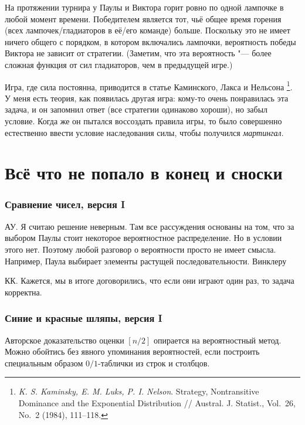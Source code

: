\documentclass[twoside]{book}
\begin{document}
На протяжении турнира у Паулы и Виктора горит ровно по одной лампочке в любой момент времени.
Победителем является тот, чьё общее время горения (всех лампочек/гладиаторов в её/его команде) больше.
Поскольку это не имеет ничего общего с порядком, в котором включались лампочки, вероятность победы Виктора не зависит от стратегии.
(Заметим, что эта вероятность "--- более сложная функция от сил гладиаторов, чем в предыдущей игре.)
\heart

Игра, где сила постоянна, приводится в статье Каминского, Лакса и Нельсона%
\footnote{\emph{K. S. Kaminsky, E. M. Luks, P. I. Nelson}. Strategy, Nontransitive Dominance and the Exponential Distribution /\!/ {Austral. J. Statist.}, Vol.~26, No.~2 (1984), 111--118.}.
У меня есть теория, как появилась другая игра: кому-то очень понравилась эта задача, и он запомнил ответ (все стратегии одинаково хороши), но забыл условие.
Когда же он пытался воссоздать правила игры, то было совершенно естественно ввести условие наследования силы, чтобы получился \emph{мартингал}.

\section*{Всё что не попало в конец и сноски}

\subsubsection{Сравнение чисел, версия I}

АУ. Я считаю решение неверным. Там все рассуждения основаны на том, 
что за выбором Паулы стоит некоторое вероятностное распределение. Но в условии этого нет. Поэтому любой разговор 
о вероятности просто не имеет смысла. Например, Паула выбирает элементы растущей последовательности. Винклеру 

КК. Кажется, мы в итоге договорились, что если они играют один раз, то задача корректна.


\subsubsection{Синие и красные шляпы, версия I}
Авторское доказательство оценки $[n/2]$ опирается на вероятностный метод. 
Можно обойтись без явного упоминания вероятностей, если построить специальным образом $0/1$-таблички из строк и столбцов.
\end{document}
